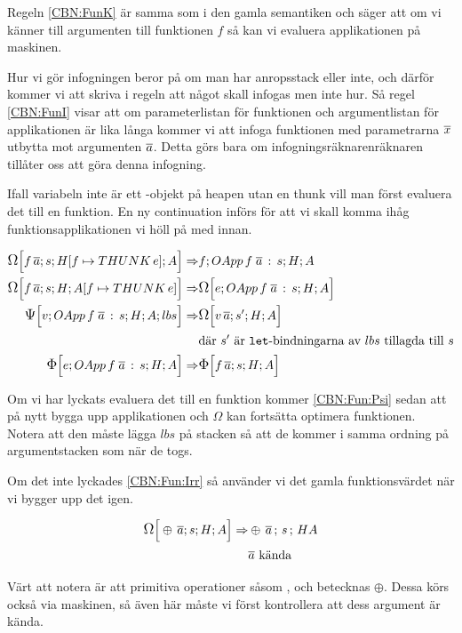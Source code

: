 \documentclass[../Optimise]{subfiles}
\begin{document}
Regeln \eqref{CBN:FunK} är samma som i den gamla semantiken och säger att om vi känner till
argumenten till funktionen $f$ så kan vi evaluera applikationen på maskinen. 

Hur vi gör infogningen beror på om man har anropsstack eller inte, och därför kommer vi
att skriva i regeln att något skall infogas men inte hur. Så regel \eqref{CBN:FunI}
visar att om parameterlistan för funktionen och argumentlistan för applikationen är
lika långa kommer vi att infoga funktionen med parametrarna $\many{x}$ utbytta mot
argumenten $\many{a}$. Detta görs bara om infogningsräknarenräknaren tillåter oss att göra 
denna infogning.

Ifall variabeln inte är ett -objekt på heapen utan en thunk vill man först evaluera
det till en funktion. En ny continuation  införs för att vi skall komma ihåg
funktionsapplikationen vi höll på med innan.

\begin{align}
\CBNOMEGA s{\heap f{\THUNK e}}A{f\, \many{a}}  \Rightarrow & \CBNMC f{\cOApp f{\many{a}}s}HA\\
\CBNOMEGA sH{\abyss f{\THUNK e}}{f\, \many{a}}  \Rightarrow & \CBNOMEGA{\cOApp f{\many{a}}s}HAe\\
\label{CBN:Fun:Psi}\CBNPSI{\cOApp f{\many{a}}s}HA{lbs}v  \Rightarrow & \CBNOMEGA {s'}HA{v\, \many{a}} \\
 & \text{där } s' \text{ är \kw{let}-bindningarna av } lbs \text{ tillagda till } s \nonumber \\
\label{CBN:Fun:Irr}\CBNIRR {\cOApp f {\many{a}}s}HAe  \Rightarrow & \CBNIRR sHA{f\, \many{a}}
\end{align}

Om vi har lyckats evaluera det till en funktion kommer \eqref{CBN:Fun:Psi} sedan att
på nytt bygga upp applikationen och $\Omega$ kan fortsätta optimera funktionen.
Notera att den måste lägga $lbs$ på stacken så att de kommer i samma ordning på 
argumentstacken som när de togs.

Om det inte lyckades \eqref{CBN:Fun:Irr} så använder vi det gamla funktionsvärdet
när vi bygger upp det igen.

\begin{align}
\CBNOMEGA sHA{\oplus\, \many{a}}  \Rightarrow & \mc{\oplus\, \many{a}}sHA \\
 & \many{a} \text{ kända } \nonumber
\end{align}

Värt att notera är att primitiva operationer såsom \ic{+\#}, \ic{*\#} och \ic{==\#} betecknas $\oplus$. 
Dessa körs också via maskinen, så även här måste vi först kontrollera att dess argument
är kända.
\end{document}
